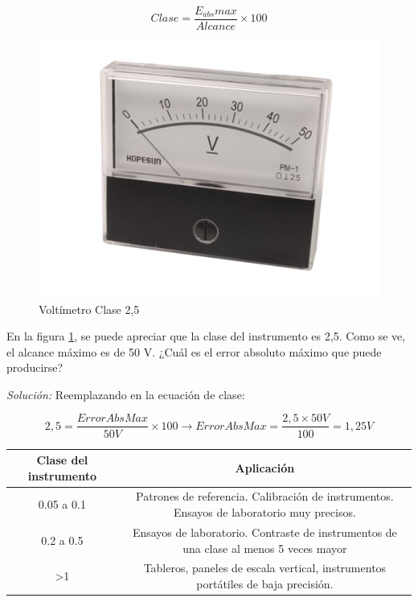 $$ Clase = \frac{E_{abs}max}{Alcance}\times 100 $$
\begin{figure}
	\includegraphics[scale=0.7]{images/volt_clase}
	\caption{Voltímetro Clase 2,5}
	\label{fig:voltclase}
\end{figure}
\begin{ejemplo}
	En la figura \ref{fig:voltclase}, se puede apreciar que la clase del instrumento es 2,5. Como se ve, el alcance máximo es de 50 V. ¿Cuál es el error absoluto máximo que puede producirse?
	
	\emph{Solución:} Reemplazando en la ecuación de clase:
	
	$$ 2,5 = \frac{ErrorAbsMax}{50 V} \times 100 
	\rightarrow
	ErrorAbsMax = \frac{2,5 \times 50V}{100} = 1,25 V $$
	
	
\end{ejemplo}

\begin{tabular}{|c|c|}
\hline 
Clase del instrumento & Aplicación \\ 
\hline 
0.05 a 0.1 & Patrones de referencia. Calibración de instrumentos. Ensayos de laboratorio muy precisos. \\ 
\hline 
0.2 a 0.5 & Ensayos de laboratorio. Contraste de instrumentos de una clase al menos 5 veces mayor \\ 
\hline 
>1 & Tableros, paneles de escala vertical, instrumentos portátiles de baja precisión. \\ 
\hline 
\end{tabular} 